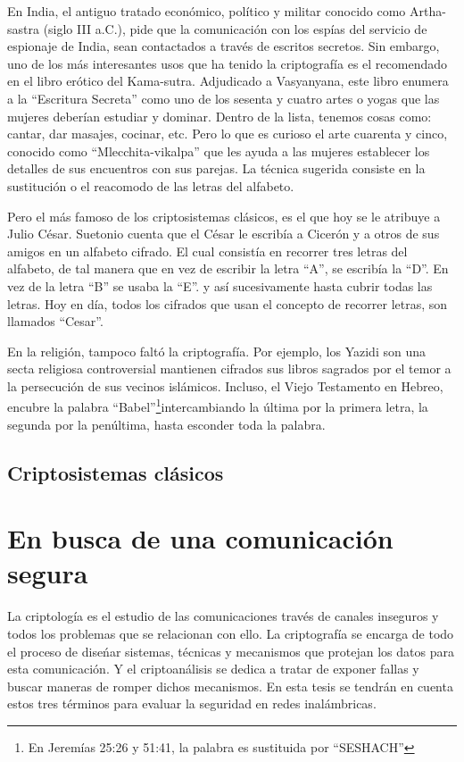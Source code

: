 En India, el antiguo tratado económico, político y militar conocido como Artha-sastra (siglo III a.C.), pide que la comunicación con los espías del servicio de espionaje de India, sean contactados a través de escritos secretos. Sin embargo, uno de los más interesantes usos que ha tenido la criptografía es el recomendado en el libro erótico del Kama-sutra. Adjudicado a Vasyanyana, este libro enumera a la ``Escritura Secreta'' como uno de los sesenta y cuatro artes o yogas que las mujeres deberían estudiar y dominar. Dentro de la lista, tenemos cosas como: cantar, dar masajes, cocinar, etc. Pero lo que es curioso el arte cuarenta y cinco, conocido como ``Mlecchita-vikalpa'' que les ayuda a las mujeres establecer los detalles de sus encuentros con sus parejas. La técnica sugerida consiste en la sustitución o el reacomodo de las letras del alfabeto.

Pero el más famoso de los criptosistemas clásicos, es el que hoy se le atribuye a Julio César. Suetonio cuenta que el César le escribía a Cicerón y a otros de sus amigos en un alfabeto cifrado. El cual consistía en recorrer tres letras del alfabeto, de tal manera que en vez de escribir la letra ``A'', se escribía la ``D''. En vez de la letra ``B'' se usaba la ``E''. y así sucesivamente hasta cubrir todas las letras. Hoy en día, todos los cifrados que usan el concepto de recorrer letras, son llamados ``Cesar''.

En la religión, tampoco faltó la criptografía. Por ejemplo, los Yazidi son una secta religiosa controversial mantienen cifrados sus libros sagrados por el temor a la persecución de sus vecinos islámicos.
Incluso, el Viejo Testamento en Hebreo, encubre la palabra ``Babel''\footnote{En Jeremías 25:26 y 51:41, la palabra es sustituida por ``SESHACH''}intercambiando la última por la primera letra, la segunda por la penúltima, hasta esconder toda la palabra.
\subsection{Criptosistemas clásicos}



\section{En busca de una comunicación segura}
La criptología es el estudio de las comunicaciones través de canales inseguros y todos los problemas que se relacionan con ello. La criptografía se encarga de todo el proceso de dise\'nar sistemas, técnicas y mecanismos que protejan los datos para esta comunicación. Y el criptoanálisis se dedica a tratar de exponer fallas y buscar maneras de romper dichos mecanismos. En esta tesis se tendrán en cuenta estos tres términos para evaluar la seguridad en redes inalámbricas.


